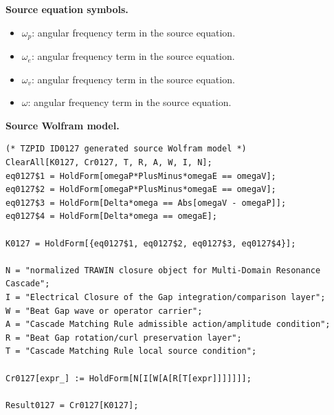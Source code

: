 \begin{minipage}[t]{0.49\linewidth}
\begingroup
\small
\raggedright
\textbf{Source equation symbols.}\par
\begin{itemize}[leftmargin=1.35em,itemsep=1pt,topsep=1pt,parsep=0pt]
    \item $\omega_p$: angular frequency term in the source equation.
    \item $\omega_e$: angular frequency term in the source equation.
    \item $\omega_v$: angular frequency term in the source equation.
    \item $\omega$: angular frequency term in the source equation.
\end{itemize}
\endgroup
\end{minipage}\hfill
\begin{minipage}[t]{0.47\linewidth}
\begingroup
\scriptsize
\raggedright
\textbf{Source Wolfram model.}\par
\begin{Verbatim}[fontsize=\tiny,breaklines=true,breakanywhere=true]
(* TZPID ID0127 generated source Wolfram model *)
ClearAll[K0127, Cr0127, T, R, A, W, I, N];
eq0127$1 = HoldForm[omegaP*PlusMinus*omegaE == omegaV];
eq0127$2 = HoldForm[omegaP*PlusMinus*omegaE == omegaV];
eq0127$3 = HoldForm[Delta*omega == Abs[omegaV - omegaP]];
eq0127$4 = HoldForm[Delta*omega == omegaE];

K0127 = HoldForm[{eq0127$1, eq0127$2, eq0127$3, eq0127$4}];

N = "normalized TRAWIN closure object for Multi-Domain Resonance Cascade";
I = "Electrical Closure of the Gap integration/comparison layer";
W = "Beat Gap wave or operator carrier";
A = "Cascade Matching Rule admissible action/amplitude condition";
R = "Beat Gap rotation/curl preservation layer";
T = "Cascade Matching Rule local source condition";

Cr0127[expr_] := HoldForm[N[I[W[A[R[T[expr]]]]]]];

Result0127 = Cr0127[K0127];
\end{Verbatim}
\endgroup
\end{minipage}


